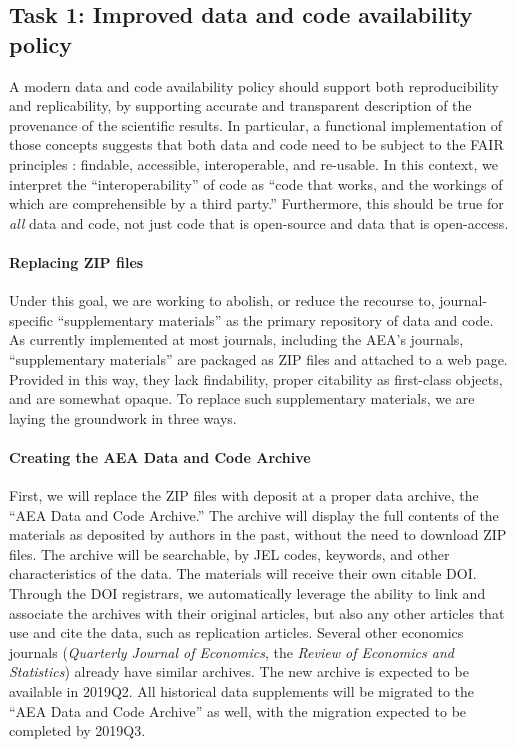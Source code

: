 \documentclass[PP]{AEA}
\begin{document}
\FloatBarrier

\subsection{Task 1: Improved data and code availability policy}
A modern data and code availability policy should support both reproducibility and replicability, by supporting accurate and transparent description of the provenance of the scientific results. In particular, a functional implementation of those concepts suggests that both data and code need to be subject to the \ac{FAIR} principles \citep{FORCE11FAIRDATAPRINCIPLES}: findable, accessible, interoperable, and re-usable. In this context, we interpret the ``interoperability'' of code as ``code that works, and the workings of which are comprehensible by a third party.'' Furthermore, this should be true for \textit{all} data and code, not just code that is open-source and data that is open-access.

\paragraph{Replacing ZIP files} Under this goal, we are working to abolish, or reduce the recourse to, journal-specific ``supplementary materials'' as the primary repository of data and code. As currently implemented at most journals, including the \ac{AEA}'s journals, ``supplementary materials'' are packaged as ZIP files and attached to a web page. Provided in this way, they lack findability, proper citability as first-class objects, and are somewhat opaque. 
To replace such supplementary materials, we are laying the groundwork in three ways. 

\paragraph{Creating the AEA Data and Code Archive} First, we will replace the ZIP files with deposit at a proper data archive, the ``AEA Data and Code Archive.'' The archive will display the full contents of the materials as deposited by authors in the past, without the need to download ZIP files. The archive will be searchable, by JEL codes, keywords, and other characteristics of the data. The materials will receive their own citable \ac{DOI}. Through the \ac{DOI} registrars, we automatically leverage the ability to link and associate the archives with their original articles, but also any other articles that use and cite the data, such as replication articles. Several other economics journals (\textit{Quarterly Journal of Economics}, the \textit{Review of Economics and Statistics}) already have similar archives. 
The new archive is expected to be available in 2019Q2. 
All historical data supplements will be migrated to the ``AEA Data and Code Archive'' as well, with the migration expected to be completed by 2019Q3.
\end{document}
